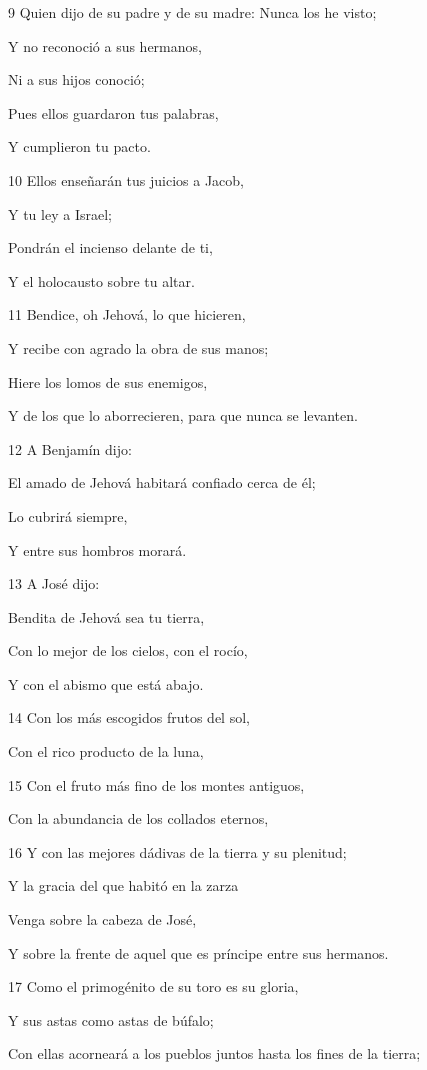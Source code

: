 \par 9 Quien dijo de su padre y de su madre: Nunca los he visto; 
\par Y no reconoció a sus hermanos,
\par Ni a sus hijos conoció;
\par Pues ellos guardaron tus palabras,
\par Y cumplieron tu pacto.
\par 10 Ellos enseñarán tus juicios a Jacob,
\par Y tu ley a Israel;
\par Pondrán el incienso delante de ti,
\par Y el holocausto sobre tu altar.
\par 11 Bendice, oh Jehová, lo que hicieren,
\par Y recibe con agrado la obra de sus manos;
\par Hiere los lomos de sus enemigos,
\par Y de los que lo aborrecieren, para que nunca se levanten.
\par 12 A Benjamín dijo:
\par El amado de Jehová habitará confiado cerca de él;
\par Lo cubrirá siempre,
\par Y entre sus hombros morará. 
\par 13 A José dijo:
\par Bendita de Jehová sea tu tierra,
\par Con lo mejor de los cielos, con el rocío,
\par Y con el abismo que está abajo.
\par 14 Con los más escogidos frutos del sol,
\par Con el rico producto de la luna,
\par 15 Con el fruto más fino de los montes antiguos,
\par Con la abundancia de los collados eternos,
\par 16 Y con las mejores dádivas de la tierra y su plenitud;
\par Y la gracia del que habitó en la zarza
\par Venga sobre la cabeza de José,
\par Y sobre la frente de aquel que es príncipe entre sus hermanos.
\par 17 Como el primogénito de su toro es su gloria,
\par Y sus astas como astas de búfalo;
\par Con ellas acorneará a los pueblos juntos hasta los fines de la tierra;
